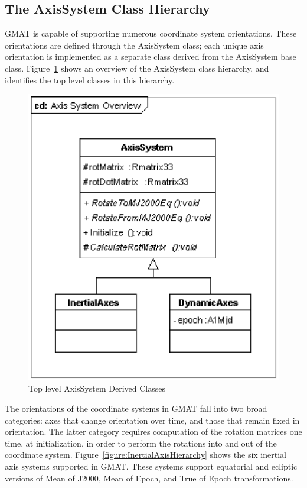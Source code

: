 \subsection{The AxisSystem Class Hierarchy}

GMAT is capable of supporting numerous coordinate system orientations.  These orientations are
defined through the AxisSystem class; each unique axis orientation is implemented as a separate
class derived from the AxisSystem base class. Figure~\ref{figure:AxisSystemOverview} shows an
overview of the AxisSystem class hierarchy, and identifies the top level classes in this hierarchy.

\begin{figure}
\begin{center}
\includegraphics[scale=0.5]{Images/AxisSystemOverview.eps}
\caption{\label{figure:AxisSystemOverview}Top level AxisSystem Derived Classes}
\end{center}
\end{figure}

The orientations of the coordinate systems in GMAT fall into two broad categories: axes that change
orientation over time, and those that remain fixed in orientation. The latter category requires
computation of the rotation matrices one time, at initialization, in order to perform the rotations
into and out of the coordinate system.  Figure~\ref{figure:InertialAxisHierarchy} shows the six
inertial axis systems supported in GMAT. These systems support equatorial and ecliptic versions
of Mean of J2000, Mean of Epoch, and True of Epoch transformations.

